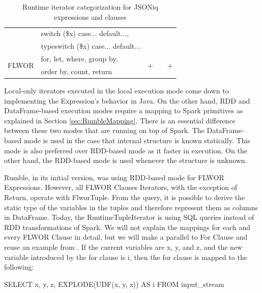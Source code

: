 \begin{table}[h!]
{\begin{tabular}{|l|l|l|l|l|}
		\cline{2-2}
		& switch (\$x) case... default...,                           &                    &                    &                     \\ 
		\cline{2-2}
		& typeswitch (\$x) case... default...                        &                    &                    &                     \\ 
		\hline
		\multirow{2}{*}{FLWOR}                 & for, let, where, group by,                                 & \multirow{2}{*}{+} & \multirow{2}{*}{}  & \multirow{2}{*}{+}  \\ 
		\cline{2-2}
		& order by, count, return                                    &                    &                    &                     \\
		\hline
\end{tabular}}
	\caption{Runtime iterator categorization for JSONiq expressions and clauses}
	\label{tab:RuntimeCategoriesMapping}
	\vspace{-3mm}
\end{table}

Local-only iterators executed in the local execution mode come down to implementing the Expression's behavior in Java. On the other hand, RDD and DataFrame-based execution modes require a mapping to Spark primitives as explained in Section \ref{sec:RumbleMapping}. There is an essential difference between these two modes that are running on top of Spark. The DataFrame-based mode is used in the case that internal structure is known statically. This mode is also preferred over RDD-based mode as it faster in execution. On the other hand, the RDD-based mode is used whenever the structure is unknown. 

Rumble, in its initial version, was using RDD-based mode for FLWOR Expressions. However, all FLWOR Clauses Iterators, with the exception of Return, operate with FlworTuple. From the query, it is possible to derive the static type of the variables in the tuples and therefore represent them as columns in DataFrame. Today, the RuntimeTupleIterator is using SQL queries instead of RDD transformations of Spark. We will not explain the mappings for each and every FLWOR Clause in detail, but we will make a parallel to For Clause and reuse an example from \cite{RumblePaper}. If the current variables are x, y, and z, and the new variable introduced by the for clause is i, then the for clause is mapped to the following:

SELECT x, y, z, EXPLODE(UDF(x, y, z)) AS i FROM input\_stream

